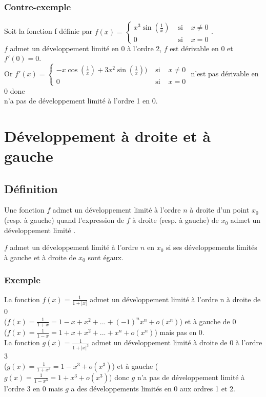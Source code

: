 \documentclass[a4paper,10pt]{book} %
\newcommand{\dl}{développement limité }
\newcommand{\abs}[1]{\left|#1\right|}
\newcommand{\dls}{développements limités }
\begin{document}
\subsubsection{Contre-exemple}
Soit la fonction f définie par $f(x)=\left\{\begin{array}{ccl}
x^3\sin(\frac{1}{x}) &\text{ si }& x\neq 0 \\
0 &\text{ si }& x=0 
\end{array}\right.$.\\

$f$ admet un \dl en 0 à l'ordre 2, $f$ est dérivable en 0 et $f'(0)=0$.\\

Or $f'(x)=\left\{\begin{array}{rcl}
-x\cos(\frac{1}{x})+3x^2\sin(\frac{1}{x})) &\text{ si }& x\neq 0\\ 0 &\text{ si }& x=0
\end{array}\right.$ n'est pas dérivable en 0 donc\\
n'a pas de \dl à l'ordre 1 en 0.

\section{Développement à droite et à gauche}
\subsection{Définition}
Une fonction $f$ admet un \dl à l'ordre $n$ à droite d'un point $x_0$ (resp. à gauche) quand l'expression de $f$ à droite (resp. à gauche) de $x_0$ admet un \dl.

$f$ admet un \dl à l'ordre $n$ en $x_0$ si ses \dls à gauche et à droite de $x_0$ sont égaux.

\subsubsection{Exemple}
La fonction $f(x)=\frac{1}{1+\abs{x}}$ admet un \dl à l'ordre n à droite de 0\\ ($f(x)=\frac{1}{1+x}=1-x+x^2+...+(-1)^nx^n+o(x^n)$) et à gauche de 0\\
($f(x)=\frac{1}{1-x}=1+x+x^2+...+x^n+o(x^n)$) mais pas en 0.\\

La fonction $g(x)=\frac{1}{1+\abs{x}^3}$ admet un \dl à droite de 0 à l'ordre 3\\($g(x)=\frac{1}{1+x^3}=1-x^3+o(x^3)$) et à gauche ($g(x)=\frac{1}{1-x^3}=1+x^3+o(x^3)$) donc $g$ n'a pas de \dl à l'ordre 3 en 0 mais $g$ a des \dls en 0 aux ordres 1 et 2.
\end{document}
